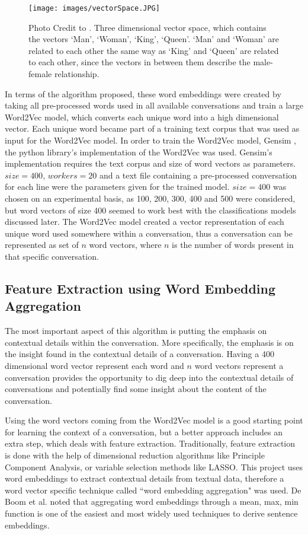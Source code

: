 \documentclass[11pt]{article}
\begin{document}
\begin{figure}[h!]
    \centering
    \texttt{[image: images/vectorSpace.JPG]}
    \caption{Photo Credit to \cite{Vidhya}. Three dimensional vector space, which contains the vectors `Man', `Woman', `King', `Queen'. `Man' and `Woman' are related to each other the same way as `King' and `Queen' are related to each other, since the vectors in between them describe the male-female relationship.}
    \label{fig:vectorSpace}
\end{figure}

In terms of the algorithm proposed, these word embeddings were created by taking all pre-processed words used in all available conversations and train a large Word2Vec model, which converts each unique word into a high dimensional vector. Each unique word became part of a training text corpus that was used as input for the Word2Vec model. In order to train the Word2Vec model, Gensim \cite{rehurek_lrec}, the python library's implementation of the Word2Vec was used. Gensim's implementation requires the text corpus and size of word vectors as parameters. $size = 400$, $workers=20$ and a text file containing a pre-processed conversation for each line were the parameters given for the trained model. $size = 400$ was chosen on an experimental basis, as 100, 200, 300, 400 and 500 were considered, but word vectors of size 400 seemed to work best with the classifications models discussed later. The Word2Vec model created a vector representation of each unique word used somewhere within a conversation, thus a conversation can be represented as set of $n$ word vectors, where $n$ is the number of words present in that specific conversation. 

\subsection{Feature Extraction using Word Embedding Aggregation}
The most important aspect of this algorithm is putting the emphasis on contextual details within the conversation. More specifically, the emphasis is on the insight found in the contextual details of a conversation. Having a 400 dimensional word vector represent each word and $n$ word vectors represent a conversation provides the opportunity to dig deep into the contextual details of conversations and potentially find some insight about the content of the conversation. 

Using the word vectors coming from the Word2Vec model is a good starting point for learning the context of a conversation, but a better approach includes an extra step, which deals with feature extraction. Traditionally, feature extraction is done with the help of dimensional reduction algorithms like Principle Component Analysis, or variable selection methods like LASSO. This project uses word embeddings to extract contextual details from textual data, therefore a word vector specific technique called ``word embedding aggregation" \cite{de2016representation} was used. De Boom et al. noted that aggregating word embeddings through a mean, max, min function is one of the easiest and most widely used techniques to derive sentence embeddings. 
\end{document}
